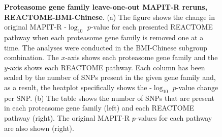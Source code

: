 \begin{figure}[ht]
\centering
\vspace*{-.5cm}
\par
{}
\caption[TBD]{\textbf{Proteasome gene family leave-one-out MAPIT-R reruns, REACTOME-BMI-Chinese}. (a) The figure shows the change in original MAPIT-R -$\log_{10}$ $p$-value for each presented REACTOME pathway when each proteasome gene family is removed one at a time. The analyses were conducted in the BMI-Chinese subgroup combination. The $x$-axis shows each proteasome gene family and the $y$-axis shows each REACTOME pathway. Each column has been scaled by the number of SNPs present in the given gene family and, as a result, the heatplot specifically shows the -$\log_{10}$ $p$-value change per SNP. (b) The table shows the number of SNPs that are present in each proteasome gene family (left) and each REACTOME pathway (right). The original MAPIT-R $p$-values for each pathway are also shown (right).}
\label{InterPath-Supp-Figure-Prot-Heatplots-Chinese}
\end{figure}
\clearpage
\addtocounter{figure}{-1}
\addtocounter{CharNumber5}{1}

